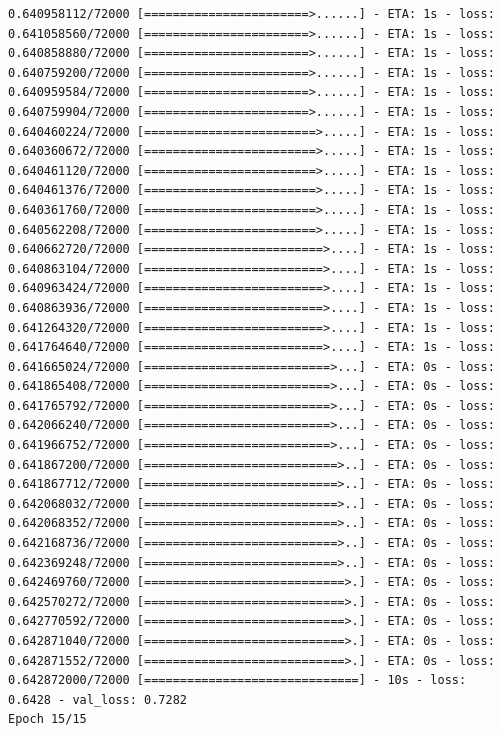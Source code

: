 \documentclass[12pt,fleqn]{article}\usepackage{../../common}
\begin{document}
\begin{verbatim}
0.640958112/72000 [=======================>......] - ETA: 1s - loss: 0.641058560/72000 [=======================>......] - ETA: 1s - loss: 0.640858880/72000 [=======================>......] - ETA: 1s - loss: 0.640759200/72000 [=======================>......] - ETA: 1s - loss: 0.640959584/72000 [=======================>......] - ETA: 1s - loss: 0.640759904/72000 [=======================>......] - ETA: 1s - loss: 0.640460224/72000 [========================>.....] - ETA: 1s - loss: 0.640360672/72000 [========================>.....] - ETA: 1s - loss: 0.640461120/72000 [========================>.....] - ETA: 1s - loss: 0.640461376/72000 [========================>.....] - ETA: 1s - loss: 0.640361760/72000 [========================>.....] - ETA: 1s - loss: 0.640562208/72000 [========================>.....] - ETA: 1s - loss: 0.640662720/72000 [=========================>....] - ETA: 1s - loss: 0.640863104/72000 [=========================>....] - ETA: 1s - loss: 0.640963424/72000 [=========================>....] - ETA: 1s - loss: 0.640863936/72000 [=========================>....] - ETA: 1s - loss: 0.641264320/72000 [=========================>....] - ETA: 1s - loss: 0.641764640/72000 [=========================>....] - ETA: 1s - loss: 0.641665024/72000 [==========================>...] - ETA: 0s - loss: 0.641865408/72000 [==========================>...] - ETA: 0s - loss: 0.641765792/72000 [==========================>...] - ETA: 0s - loss: 0.642066240/72000 [==========================>...] - ETA: 0s - loss: 0.641966752/72000 [==========================>...] - ETA: 0s - loss: 0.641867200/72000 [===========================>..] - ETA: 0s - loss: 0.641867712/72000 [===========================>..] - ETA: 0s - loss: 0.642068032/72000 [===========================>..] - ETA: 0s - loss: 0.642068352/72000 [===========================>..] - ETA: 0s - loss: 0.642168736/72000 [===========================>..] - ETA: 0s - loss: 0.642369248/72000 [===========================>..] - ETA: 0s - loss: 0.642469760/72000 [============================>.] - ETA: 0s - loss: 0.642570272/72000 [============================>.] - ETA: 0s - loss: 0.642770592/72000 [============================>.] - ETA: 0s - loss: 0.642871040/72000 [============================>.] - ETA: 0s - loss: 0.642871552/72000 [============================>.] - ETA: 0s - loss: 0.642872000/72000 [==============================] - 10s - loss: 0.6428 - val_loss: 0.7282
Epoch 15/15

\end{verbatim}
\end{document}
